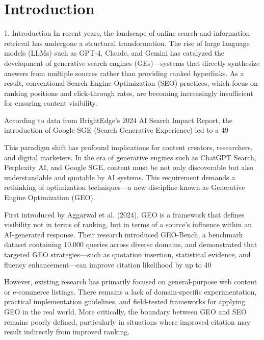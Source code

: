 \section{Introduction}

1. Introduction
In recent years, the landscape of online search and information retrieval has undergone a structural transformation. The rise of large language models (LLMs) such as GPT-4, Claude, and Gemini has catalyzed the development of generative search engines (GEs)—systems that directly synthesize answers from multiple sources rather than providing ranked hyperlinks. As a result, conventional Search Engine Optimization (SEO) practices, which focus on ranking positions and click-through rates, are becoming increasingly insufficient for ensuring content visibility.

According to data from BrightEdge’s 2024 AI Search Impact Report, the introduction of Google SGE (Search Generative Experience) led to a 49%

This paradigm shift has profound implications for content creators, researchers, and digital marketers. In the era of generative engines such as ChatGPT Search, Perplexity AI, and Google SGE, content must be not only discoverable but also understandable and quotable by AI systems. This requirement demands a rethinking of optimization techniques—a new discipline known as Generative Engine Optimization (GEO).

First introduced by Aggarwal et al. (2024), GEO is a framework that defines visibility not in terms of ranking, but in terms of a source’s influence within an AI-generated response. Their research introduced GEO-Bench, a benchmark dataset containing 10,000 queries across diverse domains, and demonstrated that targeted GEO strategies—such as quotation insertion, statistical evidence, and fluency enhancement—can improve citation likelihood by up to 40%

However, existing research has primarily focused on general-purpose web content or e-commerce listings. There remains a lack of domain-specific experimentation, practical implementation guidelines, and field-tested frameworks for applying GEO in the real world. More critically, the boundary between GEO and SEO remains poorly defined, particularly in situations where improved citation may result indirectly from improved ranking.

